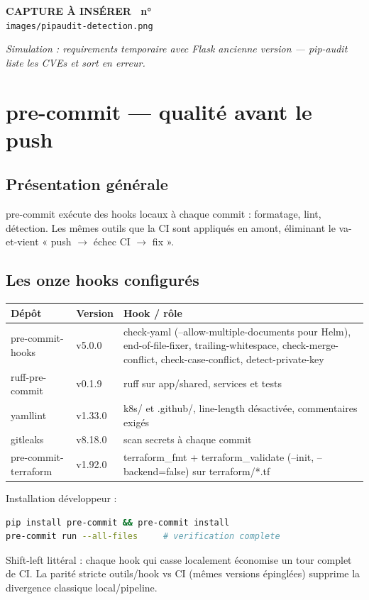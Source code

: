 \documentclass[12pt,a4paper]{article}
\newcounter{capturecount}
\newcommand{\capturebox}[2]{%
\par\vspace{4mm}
\begin{tcolorbox}[enhanced,colback=yellow!5,colframe=black!55,boxrule=0.7pt,
  borderline={0.7pt}{0pt}{black!40,dashed},
  arc=2mm,left=6pt,right=6pt,top=7pt,bottom=7pt]
\centering
{\normalsize\sffamily\bfseries CAPTURE À INSÉRER \textbar\ n°\,\stepcounter{capturecount}\thecapturecount}\\[3pt]
{\large\texttt{images/#2}}\\[7pt]
\begin{minipage}{0.94\linewidth}\centering\itshape #1\end{minipage}
\end{tcolorbox}
\par\vspace{2mm}}
\begin{document}
\capturebox{Simulation : requirements temporaire avec Flask ancienne version --- pip-audit liste les CVEs et sort en erreur.}{pipaudit-detection.png}

\section{pre-commit --- qualité avant le push}

\subsection{Présentation générale}
pre-commit exécute des hooks locaux à chaque commit : formatage, lint, détection. Les mêmes outils que la CI sont appliqués en amont, éliminant le va-et-vient « push $\rightarrow$ échec CI $\rightarrow$ fix ».

\subsection{Les onze hooks configurés}
\begin{longtable}{@{}p{3.6cm}p{2.4cm}p{8.0cm}@{}}
\toprule
\textbf{Dépôt} & \textbf{Version} & \textbf{Hook / rôle} \\
\midrule
\endhead
pre-commit-hooks & v5.0.0 & check-yaml (--allow-multiple-documents pour Helm), end-of-file-fixer, trailing-whitespace, check-merge-conflict, check-case-conflict, detect-private-key \\
ruff-pre-commit & v0.1.9 & ruff sur app/shared, services et tests \\
yamllint & v1.33.0 & k8s/ et .github/, line-length désactivée, commentaires exigés \\
gitleaks & v8.18.0 & scan secrets à chaque commit \\
pre-commit-terraform & v1.92.0 & terraform\_fmt + terraform\_validate (--init, --backend=false) sur terraform/*.tf \\
\bottomrule
\end{longtable}

Installation développeur :
\begin{lstlisting}[language=bash,caption={Mise en place locale}]
pip install pre-commit && pre-commit install
pre-commit run --all-files     # verification complete
\end{lstlisting}

\begin{whybox}
Shift-left littéral : chaque hook qui casse localement économise un tour complet de CI. La parité stricte outils/hook vs CI (mêmes versions épinglées) supprime la divergence classique local/pipeline.
\end{whybox}
\end{document}
